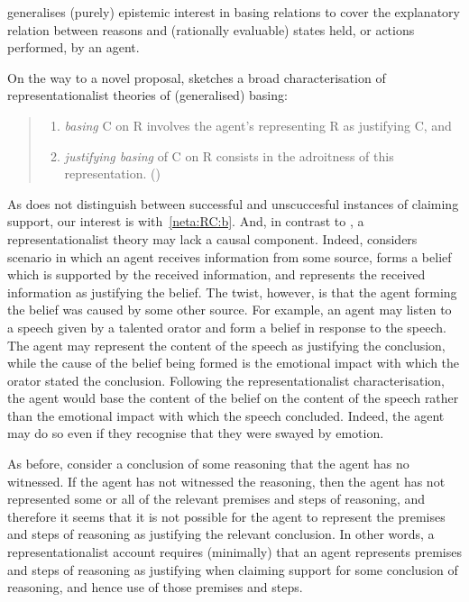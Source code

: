\begin{note}[Representationalism]
  \citeauthor{Neta:2019aa} generalises (purely) epistemic interest in basing relations to cover the explanatory relation between reasons and (rationally evaluable) states held, or actions performed, by an agent.

  On the way to a novel proposal, \citeauthor{Neta:2019aa} sketches a broad characterisation of representationalist theories of (generalised) basing:
  \begin{quote}
    \begin{enumerate}[label=(R\arabic*), ref=(R\arabic*)]
    \item\label{neta:RC:b} \emph{basing} C on R involves the agent's representing R as justifying C, and
    \item\label{neta:RC:jb} \emph{justifying basing} of C on R consists in the adroitness of this representation.\nolinebreak
          \mbox{}\hfill\mbox{(\citeyear[192]{Neta:2019aa})}
    \end{enumerate}
  \end{quote}
  As \ESU{} does not distinguish between successful and unscuccesful instances of claiming support, our interest is with~\ref{neta:RC:b}.
  And, in contrast to \citeauthor{Moser:1989tv}, a representationalist theory may lack a causal component.
  Indeed, \citeauthor{Neta:2019aa} considers scenario in which an agent receives information from some source, forms a belief which is supported by the received information, and represents the received information as justifying the belief.
  The twist, however, is that the agent forming the belief was caused by some other source.
  For example, an agent may listen to a speech given by a talented orator and form a belief in response to the speech.
  The agent may represent the content of the speech as justifying the conclusion, while the cause of the belief being formed is the emotional impact with which the orator stated the conclusion.
  Following the representationalist characterisation, the agent would base the content of the belief on the content of the speech rather than the emotional impact with which the speech concluded.
  Indeed, the agent may do so even if they recognise that they were swayed by emotion.

  As before, consider a conclusion of some reasoning that the agent has no witnessed.
  If the agent has not witnessed the reasoning, then the agent has not represented some or all of the relevant premises and steps of reasoning, and therefore it seems that it is not possible for the agent to represent the premises and steps of reasoning as justifying the relevant conclusion.
  In other words, a representationalist account requires (minimally) that an agent represents premises and steps of reasoning as justifying when claiming support for some conclusion of reasoning, and hence use of those premises and steps.


\end{note}
